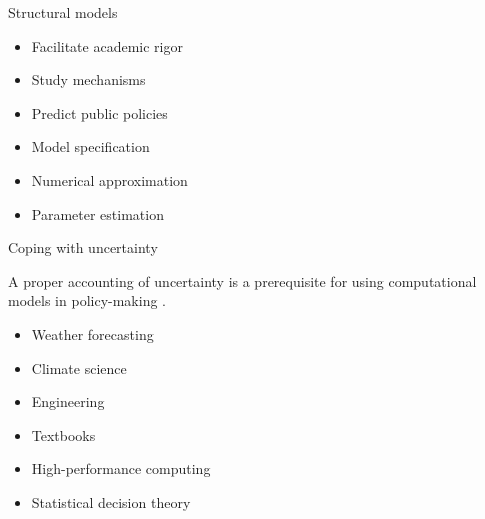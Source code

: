 \begin{frame}{Structural models}

\begin{multicols}{2}
	\vspace{0.3cm}
	\begin{itemize}\setlength\itemsep{1em}
	\item Facilitate academic rigor
	\item Study mechanisms
	\item Predict public policies
	\end{itemize}

	\pause
  \break
  \vspace{0.3cm}
	\begin{itemize}\setlength\itemsep{1em}
	\item Model specification
	\item Numerical approximation\pause
  \item {\color{red} Parameter estimation}
	\end{itemize}
	\end{multicols}


\end{frame}
\begin{frame}{Coping with uncertainty}\vspace{0.3cm}

A proper accounting of uncertainty is a prerequisite for using computational models in policy-making \citep{Council.2012,SAPEA.2019}.\vspace{0.3cm}

  \pause

  \begin{multicols}{2}
  	\vspace{0.3cm}
  	\begin{itemize}\setlength\itemsep{1em}
    \item Weather forecasting
  	\item Climate science
  	\item Engineering
  	\end{itemize}

  	\pause
    \break
    \vspace{0.3cm}
  	\begin{itemize}\setlength\itemsep{1em}
    \item Textbooks
  	\item High-performance computing\pause
  	\item {\color{red} Statistical decision theory}
  	\end{itemize}
  	\end{multicols}



\end{frame}
